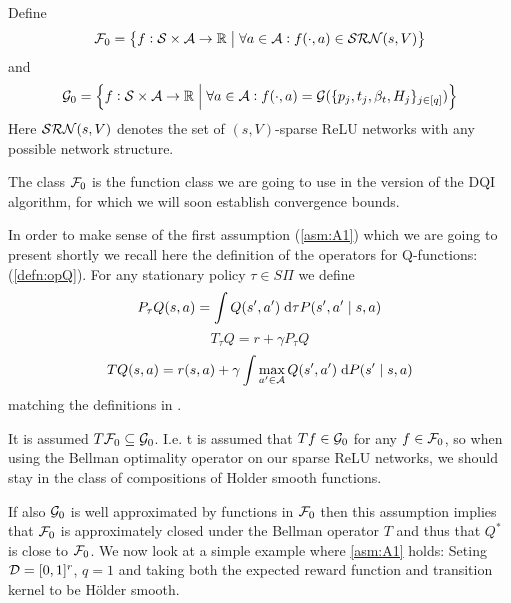 \begin{defn}
  Define
  \[ \mathcal{F}_0 = \left\{ f : \mathcal{S} \times \mathcal{A} \to \mathbb{R} \;\middle\vert\;
  \forall a \in \mathcal{A} : f(\cdot, a) \in \mathcal{SRN}(s, V) \right\} \]
  and
  \[ \mathcal{G}_0 = \left\{ f : \mathcal{S} \times \mathcal{A} \to \mathbb{R}
      \;\middle\vert\; \forall a \in \mathcal{A} :
      f(\cdot, a) = \mathcal{G}(\{p_j, t_j, \beta_t, H_j\}_{j \in [q]})
  \right\} \]
  Here $\mathcal{SRN}(s, V)$ denotes the set of $(s, V)$-sparse ReLU networks
  with any possible network structure.
  \label{defn:F0G0}
\end{defn}

The class $\mathcal{F}_0$ is the function class we are going to use in the version
of the DQI algorithm, for which we will soon establish convergence bounds.

In order to make sense of the first assumption (\cref{asm:A1}) which we
are going to present shortly
we recall here the definition of the operators for Q-functions:
(\cref{defn:opQ}). For any stationary policy $\tau \in S\Pi$ we define
\[ P_\tau Q(s, a) = \int Q(s', a') \; \mathrm{d} \tau P(s', a' \mid s, a) \]
\[ T_\tau Q = r + \gamma P_\tau Q \]
\[ T Q(s, a) = r(s, a) + \gamma
\int \max_{a' \in \mathcal{A}} Q(s', a') \; \mathrm{d} P(s' \mid s, a) \]
matching the definitions in .

\begin{asm}
  It is assumed $ T \mathcal{F}_0 \subseteq \mathcal{G}_0$.
  I.e. t is assumed that $T f \in \mathcal{G}_0$ for any $f \in \mathcal{F}_0$, 
  so when using the Bellman optimality operator on our sparse ReLU networks,
  we should stay in the class of compositions of Holder smooth functions.
  \label{asm:A1}
\end{asm}

If also $\mathcal{G}_0$ is well approximated by functions in $\mathcal{F}_0$
then this assumption implies that $\mathcal{F}_0$ is approximately closed
under the Bellman operator $T$ and thus that $Q^*$ is close to $\mathcal{F}_0$.
We now look at a simple example where \cref{asm:A1} holds:
Seting $\mathcal{D}=[0,1]^r$, $q=1$ 
and taking both the expected reward function and transition kernel
to be Hölder smooth.

